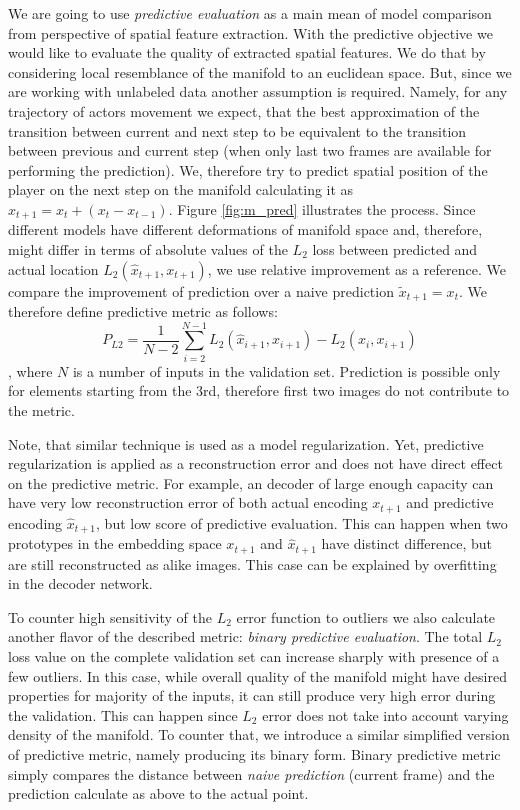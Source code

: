 We are going to use \textit{predictive evaluation} as a main mean of model comparison from perspective of spatial feature extraction. With the predictive objective we would like to evaluate the quality of extracted spatial features. We do that by considering local resemblance of the manifold to an euclidean space. But, since we are working with unlabeled data another assumption is required. Namely, for any trajectory of actors movement we expect, that the best approximation of the transition between current and next step to be equivalent to the transition between previous and current step (when only last two frames are available for performing the prediction). We, therefore try to predict spatial position of the player on the next step on the manifold calculating it as $\hat{x}_{t+1} = x_t + (x_t- x_{t-1})$. Figure \ref{fig:m_pred} illustrates the process.
Since different models have different deformations of manifold space and, therefore, might differ in terms of absolute values of the $L_2$ loss between predicted and actual location $L_2(\hat{x}_{t+1}, x_{t+1})$, we use relative improvement as a reference. We compare the improvement of prediction over a naive prediction $\tilde{x}_{t+1} = x_t$. We therefore define predictive metric as follows:
\begin{equation}
  P_{L2} = \frac{1}{N-2}\sum^{N-1}_{i=2}{L_2(\hat{x}_{i+1}, x_{i+1})} - {L_2(x_i, x_{i+1})}
\end{equation}
, where $N$ is a number of inputs in the validation set. Prediction is possible only for elements starting from the 3rd, therefore first two images do not contribute to the metric.

Note, that similar technique is used as a model regularization. Yet, predictive regularization is applied as a reconstruction error and does not have direct effect on the predictive metric. For example, an decoder of large enough capacity can have very low reconstruction error of both actual encoding $x_{t+1}$ and predictive encoding $\hat{x}_{t+1}$, but low score of predictive evaluation. This can happen when two prototypes in the embedding space $x_{t+1}$ and $\hat{x}_{t+1}$ have distinct difference, but are still reconstructed as alike images. This case can be explained by overfitting in the decoder network.

To counter high sensitivity of the $L_2$ error function to outliers we also calculate another flavor of the described metric: \textit{binary predictive evaluation}. The total $L_2$ loss value on the complete validation set can increase sharply with presence of a few outliers. In this case, while overall quality of the manifold might have desired properties for majority of the inputs, it can still produce very high error during the validation. This can happen since $L_2$ error does not take into account varying density of the manifold. To counter that, we introduce a similar simplified version of predictive metric, namely producing its binary form. Binary predictive metric simply compares the distance between \textit{naive prediction} (current frame) and the prediction calculate as above to the actual point.


